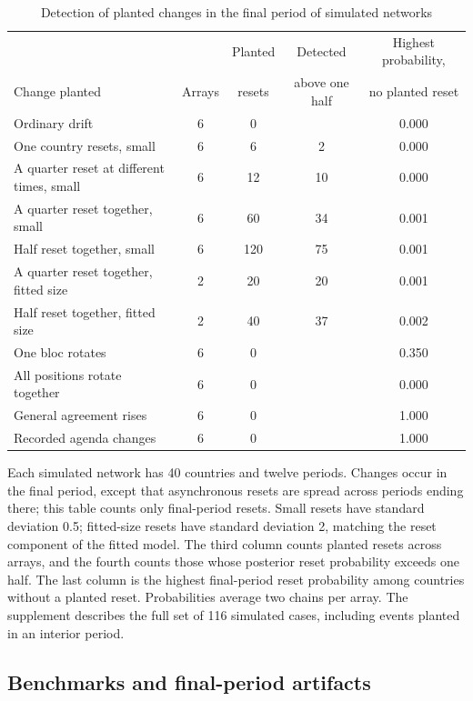 \documentclass[10pt,authoryear]{elsarticle}
\begin{document}
\begin{table}[!ht]
\centering
\caption{Detection of planted changes in the final period of simulated networks}
\label{tab:detection}
\small
\begin{tabularx}{\textwidth}{>{\raggedright\arraybackslash}Xcccc}
\toprule
 & & Planted & Detected & Highest probability, \\
Change planted & Arrays & resets & above one half & no planted reset \\
\midrule
Ordinary drift & 6 & 0 &  & 0.000 \\
One country resets, small & 6 & 6 & 2 & 0.000 \\
A quarter reset at different times, small & 6 & 12 & 10 & 0.000 \\
A quarter reset together, small & 6 & 60 & 34 & 0.001 \\
Half reset together, small & 6 & 120 & 75 & 0.001 \\
A quarter reset together, fitted size & 2 & 20 & 20 & 0.001 \\
Half reset together, fitted size & 2 & 40 & 37 & 0.002 \\
\addlinespace
One bloc rotates & 6 & 0 &  & 0.350 \\
All positions rotate together & 6 & 0 &  & 0.000 \\
General agreement rises & 6 & 0 &  & 1.000 \\
Recorded agenda changes & 6 & 0 &  & 1.000 \\
\bottomrule
\end{tabularx}
\begin{minipage}{.97\textwidth}\footnotesize Each simulated network has 40 countries and twelve periods. Changes occur in the final period, except that asynchronous resets are spread across periods ending there; this table counts only final-period resets. Small resets have standard deviation 0.5; fitted-size resets have standard deviation 2, matching the reset component of the fitted model. The third column counts planted resets across arrays, and the fourth counts those whose posterior reset probability exceeds one half. The last column is the highest final-period reset probability among countries without a planted reset. Probabilities average two chains per array. The supplement describes the full set of 116 simulated cases, including events planted in an interior period.\end{minipage}
\end{table}

\subsection{Benchmarks and final-period artifacts}
\end{document}
